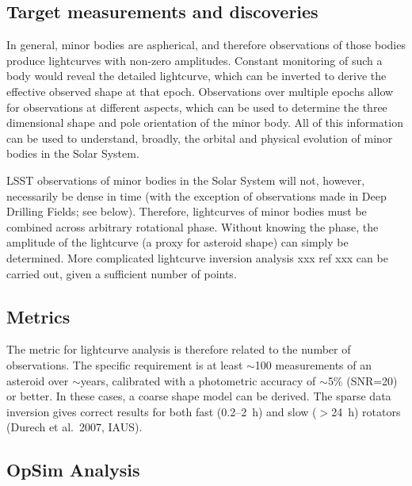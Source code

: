 \subsection{Target measurements and discoveries}
\label{sec:\secname:targets}

In general, minor bodies are aspherical,
and therefore observations of those bodies
produce lightcurves with non-zero amplitudes.
Constant monitoring of such a body would
reveal the detailed lightcurve, which can
be inverted to derive the effective observed
shape at that epoch.
Observations
over multiple epochs allow for observations
at different aspects, which can be used to
determine the three dimensional shape and pole
orientation of the minor body. All of this
information can be used to understand,
broadly, the orbital and physical evolution
of minor bodies in the Solar System.

LSST observations of minor bodies in the Solar System
will not, however, necessarily be dense in time
(with the exception of observations made in
Deep Drilling Fields; see below).
Therefore, lightcurves of minor bodies must
be combined across arbitrary rotational phase.
Without knowing the phase, the amplitude of
the lightcurve (a proxy for
asteroid shape) can simply be determined.
More complicated lightcurve inversion analysis
xxx ref xxx
can be carried out, given a sufficient number
of points.



\subsection{Metrics}
\label{sec:\secname:metrics}

The metric for lightcurve analysis
is therefore related to the number
of observations. The specific requirement
is
at least $\sim$100 measurements of an asteroid over
$\sim$years,
calibrated with a photometric accuracy of
$\sim$5\% (SNR=20)
or better. In these cases,
a coarse shape model can be derived.
The sparse data inversion gives correct results for both fast (0.2--2~h) and slow ($>$24~h) rotators (Durech et al.\ 2007, IAUS).




\subsection{OpSim Analysis}
\label{sec:\secname:analysis}

